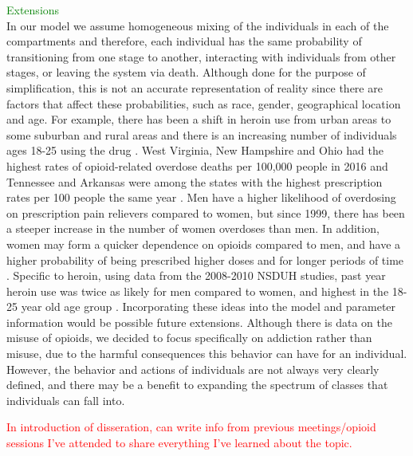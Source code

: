 \documentclass[12pt]{article}
\begin{document}
\textcolor{green}{Extensions}\\
In our model we assume homogeneous mixing of the individuals in each of the compartments and therefore, each individual has the same probability of transitioning from one stage to another, interacting with individuals from other stages, or leaving the system via death. Although done for the purpose of simplification, this is not an accurate representation of reality since there are factors that affect these probabilities, such as race, gender, geographical location and age. For example, there has been a shift in heroin use from urban areas to some suburban and rural areas and there is an increasing number of individuals ages 18-25 using the drug \cite{NIDA2}. West Virginia, New Hampshire and Ohio had the highest rates of opioid-related overdose deaths per 100,000 people in 2016 and Tennessee and Arkansas were among the states with the highest prescription rates per 100 people the same year \cite{NIH3}. Men have a higher likelihood of overdosing on prescription pain relievers compared to women, but since 1999, there has been a steeper increase in the number of women overdoses than men. In addition, women may form a quicker dependence on opioids compared to men, and have a higher probability of being prescribed higher doses and for longer periods of time \cite{CDC5}. Specific to heroin, using data from the 2008-2010 NSDUH studies, past year heroin use was twice as likely for men compared to women, and highest in the 18-25 year old age group \cite{Jones}. Incorporating these ideas into the model and parameter information would be possible future extensions. Although there is data on the misuse of opioids, we decided to focus specifically on addiction rather than misuse, due to the harmful consequences this behavior can have for an individual. However, the behavior and actions of individuals are not always very clearly defined, and there may be a benefit to expanding the spectrum of classes that individuals can fall into. 



\textcolor{red}{In introduction of disseration, can write info from previous meetings/opioid sessions I've attended to share everything I've learned about the topic.}




\end{document}
